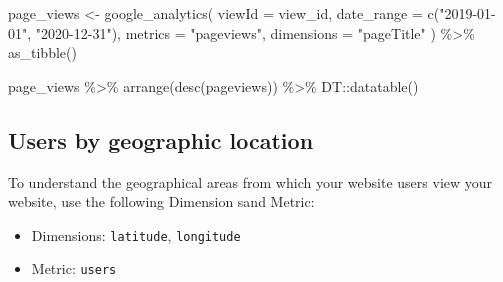 \documentclass[
]{book}
\newenvironment{Shaded}{\begin{snugshade}}{\end{snugshade}}
\newcommand{\AttributeTok}[1]{\textcolor[rgb]{0.77,0.63,0.00}{#1}}
\newcommand{\FunctionTok}[1]{\textcolor[rgb]{0.00,0.00,0.00}{#1}}
\newcommand{\NormalTok}[1]{#1}
\newcommand{\OtherTok}[1]{\textcolor[rgb]{0.56,0.35,0.01}{#1}}
\newcommand{\SpecialCharTok}[1]{\textcolor[rgb]{0.00,0.00,0.00}{#1}}
\newcommand{\StringTok}[1]{\textcolor[rgb]{0.31,0.60,0.02}{#1}}
\providecommand{\tightlist}{%
  \setlength{\itemsep}{0pt}\setlength{\parskip}{0pt}}
\begin{document}
\begin{Shaded}
\begin{Highlighting}[]
\NormalTok{page\_views }\OtherTok{\textless{}{-}} \FunctionTok{google\_analytics}\NormalTok{(}
  \AttributeTok{viewId =}\NormalTok{ view\_id,}
  \AttributeTok{date\_range =} \FunctionTok{c}\NormalTok{(}\StringTok{"2019{-}01{-}01"}\NormalTok{, }\StringTok{"2020{-}12{-}31"}\NormalTok{),}
  \AttributeTok{metrics =} \StringTok{"pageviews"}\NormalTok{,}
  \AttributeTok{dimensions =} \StringTok{"pageTitle"}
\NormalTok{) }\SpecialCharTok{\%\textgreater{}\%}
  \FunctionTok{as\_tibble}\NormalTok{()}

\NormalTok{page\_views }\SpecialCharTok{\%\textgreater{}\%}
  \FunctionTok{arrange}\NormalTok{(}\FunctionTok{desc}\NormalTok{(pageviews)) }\SpecialCharTok{\%\textgreater{}\%}
\NormalTok{  DT}\SpecialCharTok{::}\FunctionTok{datatable}\NormalTok{()}
\end{Highlighting}
\end{Shaded}

\hypertarget{users-by-location}{%
\subsection{Users by geographic location}\label{users-by-location}}

To understand the geographical areas from which your website users view your website, use the following Dimension sand Metric:

\begin{itemize}
\tightlist
\item
  Dimensions: \texttt{latitude}, \texttt{longitude}
\item
  Metric: \texttt{users}
\end{itemize}
\end{document}
